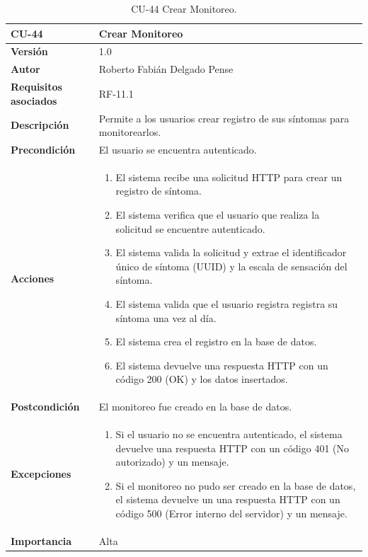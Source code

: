 \begin{table}[p]
	\centering
	\begin{tabularx}{\linewidth}{ p{} p{} }
		\toprule
		\textbf{CU-44}    & \textbf{Crear Monitoreo}\\
		\toprule
		\textbf{Versión}              & 1.0    \\
		\textbf{Autor}                & Roberto Fabián Delgado Pense \\
		\textbf{Requisitos asociados} & RF-11.1 \\ 
		\textbf{Descripción}          & Permite a los usuarios crear registro de sus síntomas para monitorearlos. \\
		\textbf{Precondición}         & El usuario se encuentra autenticado. \\  
		\textbf{Acciones}             &
		\begin{enumerate}
			\def\labelenumi{\arabic{enumi}.}
			\tightlist
			\item El sistema recibe una solicitud HTTP para crear un registro de síntoma.
                \item El sistema verifica que el usuario que realiza la solicitud se encuentre autenticado.
                \item El sistema valida la solicitud y extrae el identificador único de síntoma (UUID) y la escala de sensación del síntoma.
                \item El sistema valida que el usuario registra registra su síntoma una vez al día.
                \item El sistema crea el registro en la base de datos.
                \item El sistema devuelve una respuesta HTTP con un código 200 (OK) y los datos insertados.         
            \end{enumerate}\\
		\textbf{Postcondición}        & El monitoreo fue creado en la base de datos. \\
		\textbf{Excepciones}          & 
              \begin{enumerate}
			\def\labelenumi{\arabic{enumi}.}
			\tightlist
   			\item Si el usuario no se encuentra autenticado, el sistema devuelve una                 respuesta HTTP con un código 401 (No autorizado) y un mensaje.
                \item   Si el monitoreo no pudo ser creado en la base de datos, el sistema devuelve un                           una respuesta HTTP con un código 500 (Error interno del servidor) y un mensaje. 
            \end{enumerate}\\
		\textbf{Importancia}          & Alta \\
		\bottomrule
	\end{tabularx}
	\caption{CU-44 Crear Monitoreo.}
\end{table}

